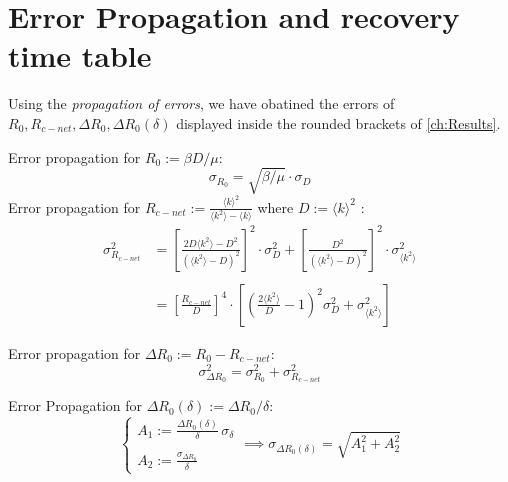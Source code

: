 \documentclass[a4paper,10pt, oneside]{book} %
\theoremstyle{definition}
\begin{document}
\section{Error Propagation and recovery time table}
\label{App:error_propagation}
Using the \textit{propagation of errors}, we have obatined the errors of $R_0,R_{c-net},\Delta R_0, \Delta R_0(\delta)$ displayed inside the rounded brackets of \autoref{ch:Results}. 

Error propagation for $R_0 := \beta D/ \mu$:
\begin{equation}
	\sigma_{R_0} = \sqrt{\beta / \mu} \cdot \sigma_D
\end{equation} 
Error propagation for $R_{c-net}:=\frac{ \langle k \rangle^2 }{\langle k^2 \rangle-\langle k \rangle}$ where $ D:= \langle k \rangle^{2}$ :
\begin{equation}
	\begin{aligned}
		\sigma_{R_{c-net}}^{2} &=
			\left[\frac{2 D \langle k^2 \rangle - D^{2}}{\left(\langle k^2 \rangle - D \right)^{2}}\right]^{2} 
			\cdot \sigma_D^{2} + 
			\left[ \frac{D^{2}}{\left(\langle k^2 \rangle - D\right)^{2}}\right]^{2}
			\cdot \sigma_{\langle k^2 \rangle}^{2} \\ \\
			&= \left[\frac{R_{c-net}}{D}\right]^{4} \cdot 
			\left[
			\left( \frac{2 \langle k^2 \rangle}{D} -1 \right)^{2} \sigma_D^{2} 
			+ 
			\sigma_{\langle k^2 \rangle}^{2} \right]
	\end{aligned}
\end{equation}

Error propagation for $\Delta R_0 := R_0 - R_{c-net}$:
\begin{equation}
	\sigma_{\Delta R_0}^{2} = \sigma_{R_0}^{2} + \sigma_{R_{c-net}}^{2}
\end{equation}

Error Propagation for $\Delta R_0(\delta):= \Delta R_0 / \delta$:
\begin{equation}
	\begin{cases}
		A_1 := \frac{\Delta R_0(\delta)}{\delta} \, \sigma_{\delta} \\ \\
		A_2 := \frac{\sigma_{\Delta R_0}}{\delta}
	\end{cases}
	\implies \sigma_{\Delta R_0(\delta)} = \sqrt{A_1^{2}+A_2^{2}}
\end{equation}

\end{document}
